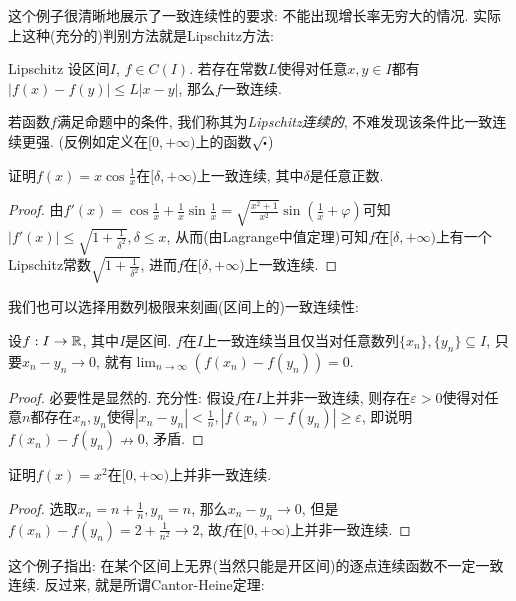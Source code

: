 这个例子很清晰地展示了一致连续性的要求: 不能出现增长率无穷大的情况. 实际上这种(充分的)判别方法就是Lipschitz方法: 

\begin{proposition}{Lipschitz}
	设区间$I$, $f \in C(I)$. 若存在常数$L$使得对任意$x,y \in I$都有$|f(x)-f(y)| \leq L|x-y|$, 那么$f$一致连续. 
\end{proposition}
\begin{remark}
	若函数$f$满足命题中的条件, 我们称其为\textit{Lipschitz连续的}, 不难发现该条件比一致连续更强. (反例如定义在$[0,+\infty )$上的函数$\sqrt{\bigcdot}$)
\end{remark}

\begin{example}
	证明$f(x)=x\cos \frac{1}{x}$在$[\delta ,+\infty)$上一致连续, 其中$\delta$是任意正数. 
\end{example}
\begin{proof}
	由$f'(x) = \cos \frac{1}{x} + \frac{1}{x} \sin \frac{1}{x} = \sqrt{\frac{x^2+1}{x^2}} \sin (\frac{1}{x}+\varphi)$可知$|f'(x)| \leq \sqrt{1+\frac{1}{\delta ^2}}, \delta \leq x$, 从而(由Lagrange中值定理)可知$f$在$[\delta ,+\infty )$上有一个Lipschitz常数$\sqrt{1+\frac{1}{\delta ^2}}$, 进而$f$在$[\delta ,+\infty )$上一致连续. 
\end{proof}

我们也可以选择用数列极限来刻画(区间上的)一致连续性: 

\begin{proposition}{}
	设$f:I \to \mathbb{R}$, 其中$I$是区间. $f$在$I$上一致连续当且仅当对任意数列$\{ x_n \},\{ y_n \} \subseteq I$, 只要$x_n- y_n \to 0$, 就有$\lim_{n\to \infty} (f(x_n)-f(y_n))=0$. 
\end{proposition}
\begin{proof}
	必要性是显然的. 充分性: 假设$f$在$I$上并非一致连续, 则存在$\varepsilon >0$使得对任意$n$都存在$x_n,y_n$使得$|x_n-y_n|<\frac{1}{n}, |f(x_n)-f(y_n)| \geq \varepsilon$, 即说明$f(x_n) - f(y_n) \nrightarrow 0$, 矛盾. 
\end{proof}

\begin{example}
	证明$f(x)=x^2$在$[0,+\infty)$上并非一致连续. 
\end{example}
\begin{proof}
	选取$x_n=n+\frac{1}{n},y_n=n$, 那么$x_n-y_n \to 0$, 但是$f(x_n)-f(y_n)=2+\frac{1}{n^2} \to 2$, 故$f$在$[0,+\infty)$上并非一致连续. 
\end{proof}

这个例子指出: 在某个区间上无界(当然只能是开区间)的逐点连续函数不一定一致连续. 反过来, 就是所谓Cantor-Heine定理: 

